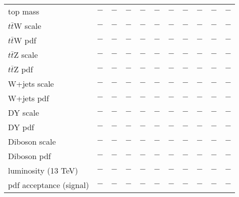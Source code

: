 {\begin{tabular}{l|c|c|cccccccc}
top mass                     & $-$ & $-$ & $-$        & $-$        & $-$          & $-$                & $-$                 & $-$          & $-$    & $-$     \\ 
$t\bar{t}$W scale            & $-$ & $-$ & $-$        & $-$        & $-$          & $-$                & $-$                 & $-$          & $-$    & $-$     \\ 
$t\bar{t}$W pdf              & $-$ & $-$ & $-$        & $-$        & $-$          & $-$                & $-$                 & $-$          & $-$    & $-$     \\ 
$t\bar{t}$Z scale            & $-$ & $-$ & $-$        & $-$        & $-$          & $-$                & $-$                 & $-$          & $-$    & $-$     \\ 
$t\bar{t}$Z pdf              & $-$ & $-$ & $-$        & $-$        & $-$          & $-$                & $-$                 & $-$          & $-$    & $-$     \\ 
W+jets scale                 & $-$ & $-$ & $-$        & $-$        & $-$          & $-$                & $-$                 & $-$          & $-$    & $-$     \\ 
W+jets pdf                   & $-$ & $-$ & $-$        & $-$        & $-$          & $-$                & $-$                 & $-$          & $-$    & $-$     \\ 
DY scale                     & $-$ & $-$ & $-$        & $-$        & $-$          & $-$                & $-$                 & $-$          & $-$    & $-$     \\ 
DY pdf                       & $-$ & $-$ & $-$        & $-$        & $-$          & $-$                & $-$                 & $-$          & $-$    & $-$     \\ 
Diboson scale                & $-$ & $-$ & $-$        & $-$        & $-$          & $-$                & $-$                 & $-$          & $-$    & $-$     \\ 
Diboson pdf                  & $-$ & $-$ & $-$        & $-$        & $-$          & $-$                & $-$                 & $-$          & $-$    & $-$     \\ 
luminosity (13 TeV)          & $-$ & $-$ & $-$        & $-$        & $-$          & $-$                & $-$                 & $-$          & $-$    & $-$     \\ 
pdf acceptance (signal)      & $-$ & $-$ & $-$        & $-$        & $-$          & $-$                & $-$                 & $-$          & $-$    & $-$     \\ 

\end{tabular}}
